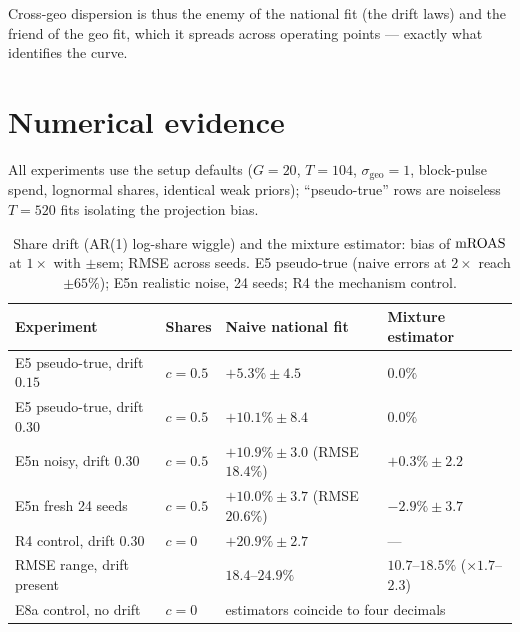 Cross-geo dispersion is thus the enemy of the national fit (the drift laws) and the friend of the geo fit, which it spreads across operating points --- exactly what identifies the curve.

\section{Numerical evidence}

All experiments use the setup defaults ($G = 20$, $T = 104$, $\sigma_{\mathrm{geo}} = 1$, block-pulse spend, lognormal shares, identical weak priors); ``pseudo-true'' rows are noiseless $T = 520$ fits isolating the projection bias.

\begin{table}[htbp]
\centering\small
\caption{Share drift (AR(1) log-share wiggle) and the mixture estimator: bias of $\mathrm{mROAS}$ at $1\times$ with $\pm$sem; RMSE across seeds. E5 pseudo-true (naive errors at $2\times$ reach $\pm 65\%$); E5n realistic noise, 24 seeds; R4 the mechanism control.}
\label{aggregation:tab:drift}
\begin{tabular}{@{}llll@{}}
\toprule
Experiment & Shares & Naive national fit & Mixture estimator \\
\midrule
E5 pseudo-true, drift $0.15$ & $c = 0.5$ & $+5.3\% \pm 4.5$ & $0.0\%$ \\
E5 pseudo-true, drift $0.30$ & $c = 0.5$ & $+10.1\% \pm 8.4$ & $0.0\%$ \\
E5n noisy, drift $0.30$ & $c = 0.5$ & $+10.9\% \pm 3.0$ (RMSE $18.4\%$) & $+0.3\% \pm 2.2$ \\
E5n fresh 24 seeds & $c = 0.5$ & $+10.0\% \pm 3.7$ (RMSE $20.6\%$) & $-2.9\% \pm 3.7$ \\
R4 control, drift $0.30$ & $c = 0$ & $+20.9\% \pm 2.7$ & --- \\
RMSE range, drift present & & $18.4$--$24.9\%$ & $10.7$--$18.5\%$ ($\times 1.7$--$2.3$) \\
E8a control, no drift & $c = 0$ & \multicolumn{2}{l}{estimators coincide to four decimals} \\
\bottomrule
\end{tabular}
\end{table}

